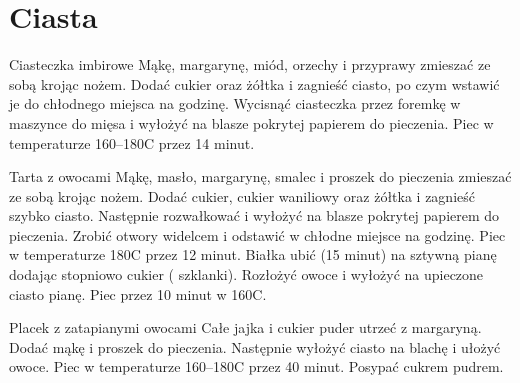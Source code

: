 \documentclass[a4paper,12pt]{article}
\begin{document}
\tableofcontents



\newpage
\section{Ciasta}

\begin{recipe}{Ciasteczka imbirowe}{}{}
Mąkę, margarynę, miód, orzechy i przyprawy zmieszać ze sobą krojąc nożem.
Dodać cukier oraz żółtka i zagnieść ciasto, po czym wstawić je do chłodnego miejsca na godzinę.
Wycisnąć ciasteczka przez foremkę w maszynce do mięsa i wyłożyć na blasze pokrytej papierem do pieczenia. Piec w temperaturze 160--180\0C przez 14 minut.
\end{recipe}

\begin{recipe}{Tarta z owocami}{}{}
Mąkę, masło, margarynę, smalec i proszek do pieczenia zmieszać ze sobą krojąc nożem. 
Dodać cukier, cukier waniliowy oraz żółtka i zagnieść szybko ciasto. Następnie rozwałkować i wyłożyć na blasze pokrytej papierem do pieczenia. 
Zrobić otwory widelcem i odstawić w chłodne miejsce na godzinę.
Piec w temperaturze 180\0C przez 12 minut.
Białka ubić (15 minut) na sztywną pianę dodając stopniowo cukier ( szklanki). Rozłożyć owoce i wyłożyć na upieczone ciasto pianę.  Piec przez 10 minut w 160\0C.
\end{recipe}

\begin{recipe}{Placek z zatapianymi owocami}{}{}
Całe jajka i cukier puder utrzeć z margaryną. Dodać mąkę i proszek do pieczenia. Następnie wyłożyć ciasto na blachę i ułożyć owoce. Piec w temperaturze 160--180\0C przez 40 minut. Posypać cukrem pudrem.
\end{recipe}
\end{document}

